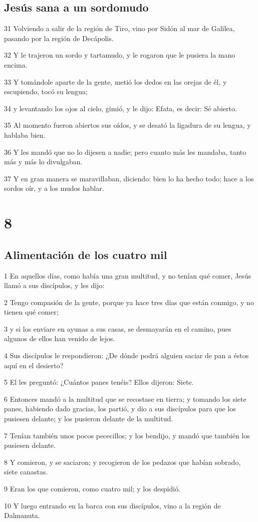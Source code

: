 \section*{Jesús sana a un sordomudo}

\par 31 Volviendo a salir de la región de Tiro, vino por Sidón al mar de Galilea, pasando por la región de Decápolis.
\par 32 Y le trajeron un sordo y tartamudo, y le rogaron que le pusiera la mano encima.
\par 33 Y tomándole aparte de la gente, metió los dedos en las orejas de él, y escupiendo, tocó su lengua;
\par 34 y levantando los ojos al cielo, gimió, y le dijo: Efata, es decir: Sé abierto.
\par 35 Al momento fueron abiertos sus oídos, y se desató la ligadura de su lengua, y hablaba bien.
\par 36 Y les mandó que no lo dijesen a nadie; pero cuanto más les mandaba, tanto más y más lo divulgaban.
\par 37 Y en gran manera se maravillaban, diciendo: bien lo ha hecho todo; hace a los sordos oír, y a los mudos hablar.

\chapter{8}

\section*{Alimentación de los cuatro mil}

\par 1 En aquellos días, como había una gran multitud, y no tenían qué comer, Jesús llamó a sus discípulos, y les dijo:
\par 2 Tengo compasión de la gente, porque ya hace tres días que están conmigo, y no tienen qué comer;
\par 3 y si los enviare en ayunas a sus casas, se desmayarán en el camino, pues algunos de ellos han venido de lejos.
\par 4 Sus discípulos le respondieron: ¿De dónde podrá alguien saciar de pan a éstos aquí en el desierto?
\par 5 El les preguntó: ¿Cuántos panes tenéis? Ellos dijeron: Siete.
\par 6 Entonces mandó a la multitud que se recostase en tierra; y tomando los siete panes, habiendo dado gracias, los partió, y dio a sus discípulos para que los pusiesen delante; y los pusieron delante de la multitud.
\par 7 Tenían también unos pocos pececillos; y los bendijo, y mandó que también los pusiesen delante.
\par 8 Y comieron, y se saciaron; y recogieron de los pedazos que habían sobrado, siete canastas.
\par 9 Eran los que comieron, como cuatro mil; y los despidió.
\par 10 Y luego entrando en la barca con sus discípulos, vino a la región de Dalmanuta.

